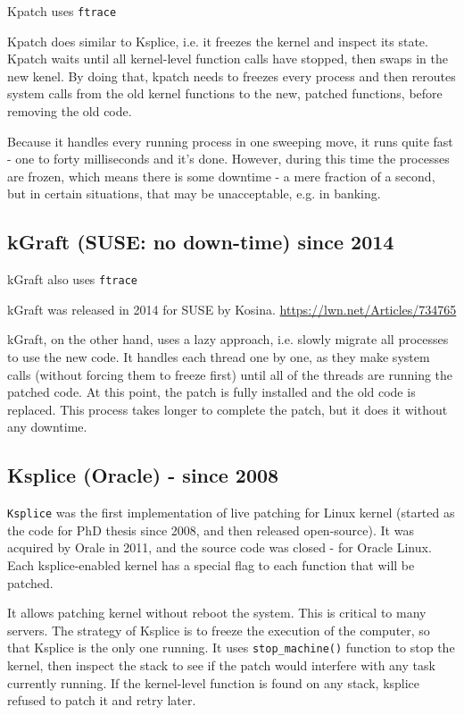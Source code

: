 Kpatch uses \verb!ftrace!

Kpatch does similar to Ksplice, i.e. it freezes the kernel and inspect its
state. Kpatch waits until all kernel-level function calls have stopped, then
swaps in the new kenel.
By doing that, kpatch needs to freezes every process and then reroutes system
calls from the old kernel functions to the new, patched functions, before
removing the old code. 

Because it handles every running process in one sweeping move, it runs quite
fast - one to forty milliseconds and it's done.
However, during this time the processes are frozen, which means there is some
downtime - a mere fraction of a second, but in certain situations, that may be
unacceptable, e.g. in banking.

\subsection{kGraft (SUSE: no down-time) since 2014}

kGraft also uses \verb!ftrace!

kGraft was released in 2014 for SUSE by Kosina.
\url{https://lwn.net/Articles/734765}

kGraft, on the other hand, uses a lazy approach, i.e. slowly migrate all
processes to use the new code. It handles each thread one by one, as they make
system calls (without forcing them to freeze first) until all of the threads are
running the patched code. At this point, the patch is fully installed and the
old code is replaced. This process takes longer to complete the patch, but it
does it without any downtime.    



\subsection{Ksplice (Oracle) - since 2008}
\label{sec:Ksplice}

\verb!Ksplice! was the first implementation of live patching for Linux kernel
(started as the code for PhD thesis since 2008, and then released open-source).
It was acquired by Orale in 2011, and the source code was closed - for Oracle
Linux. Each ksplice-enabled kernel has a special flag to each function that will
be patched.

It allows patching kernel without reboot the system. This is critical to many
servers. The strategy of Ksplice is to freeze the execution of the computer, so that
Ksplice is the only one running. 
It uses \verb!stop_machine()! function to stop the kernel, then inspect the
stack to see if the patch would interfere with any task currently running.
If the kernel-level function is found on any stack, ksplice refused to patch it
and retry later.

